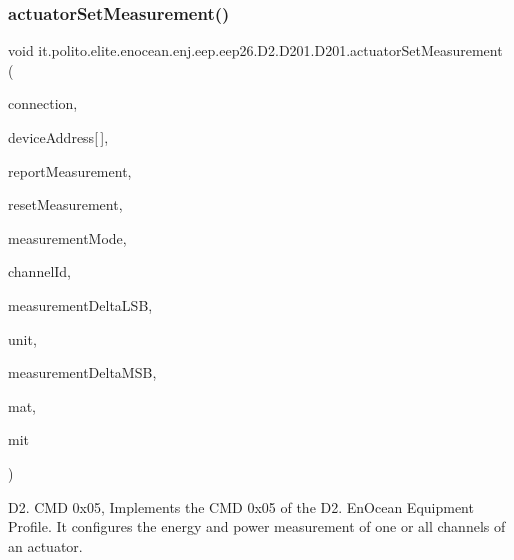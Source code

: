 \subsubsection{\texorpdfstring{actuator\+Set\+Measurement()}{actuatorSetMeasurement()}}
{\footnotesize\ttfamily void it.\+polito.\+elite.\+enocean.\+enj.\+eep.\+eep26.\+D2.\+D201.\+D201.\+actuator\+Set\+Measurement (\begin{DoxyParamCaption}\item[{\hyperlink{classit_1_1polito_1_1elite_1_1enocean_1_1enj_1_1communication_1_1_en_j_connection}{En\+J\+Connection}}]{connection,  }\item[{byte}]{device\+Address\mbox{[}$\,$\mbox{]},  }\item[{byte}]{report\+Measurement,  }\item[{byte}]{reset\+Measurement,  }\item[{byte}]{measurement\+Mode,  }\item[{byte}]{channel\+Id,  }\item[{byte}]{measurement\+Delta\+L\+SB,  }\item[{byte}]{unit,  }\item[{byte}]{measurement\+Delta\+M\+SB,  }\item[{byte}]{mat,  }\item[{byte}]{mit }\end{DoxyParamCaption})}

D2. C\+MD 0x05, Implements the C\+MD 0x05 of the D2. En\+Ocean Equipment Profile. It configures the energy and power measurement of one or all channels of an actuator.


